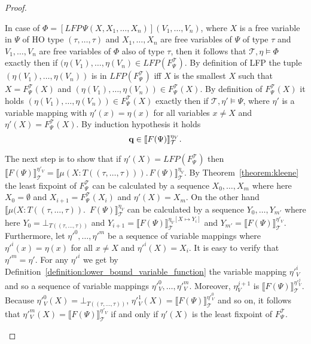 \begin{proof}
\begin{compactitem}
        \item In case of $\Phi = [LFP\,\Psi(X, X_1, \dots, X_n)](V_1, \dots, V_n)$, where $X$ is a
        free variable in $\Psi$ of HO type $(\tau, \dots, \tau)$ and $X_1, \dots, X_n$ are free
        variables of $\Psi$ of type $\tau$ and $V_1, \dots, V_n$ are free variables of $\Phi$ also of type $\tau$, then
        it follows that $\mathcal{T}, \eta \models \Phi$ exactly then if $(\eta(V_1), \dots, \eta(V_n) \in LFP
        (F_\Psi^\mathcal{T})$. By definition of LFP the tuple $(\eta(V_1), \dots, \eta(V_n))$ is in
        $LFP(F_\Psi^\mathcal{T})$ iff $X$ is the smallest $X$ such that $X = F_\Psi^\mathcal{T}(X)$ and $(\eta(V_1), \dots, \eta(V_n)) \in
        F_\Psi^\mathcal{T}(X)$. By definition of $F_\Psi^\mathcal{T}(X)$ it holds $(\eta
        (V_1), \dots, \eta(V_n)) \in F_\Psi^\mathcal{T}(X)$ exactly then if $\mathcal{T}, \eta' 
        \models \Psi$, where $\eta'$ is a variable mapping with $\eta'(x) = \eta(x)$ for all variables $x \neq X$ and $\eta'(X) = F_\Psi^\mathcal{T}(X)$. By induction hypothesis it holds
        \[\emph{q} \in \llbracket  F(\Psi)
        \rrbracket^{\eta_V}_\mathcal{T}.\]

The next step is to show that if $\eta'(X) = LFP(F^\mathcal{T}_\Psi)$ then $\llbracket F(\Psi) \rrbracket^{\eta'_V}_\mathcal{T} = \llbracket \mu (X \colon T((\tau, \dots, \tau))).\,F(\Psi)\rrbracket_\mathcal{T}^{\eta_V}$. 
        By Theorem~\ref{theorem:kleene} the least fixpoint of $F^\mathcal{T}_\Psi$ can be calculated by a sequence $X_0, \dots, X_m$ where here $X_0 = \emptyset$ and $X_{i+1} 
        = F_\Psi^\mathcal{T}(X_i)$ and $\eta'(X) = X_m$. On the other hand $\llbracket \mu (X \colon T((\tau, \dots, \tau)).$ $\,F(\Psi)\rrbracket_\mathcal{T}^{\eta_V}$ can be calculated by a sequence 
         $Y_0, \dots, Y_{m'}$ where here $Y_0 = \bot_{T((\tau, \dots, \tau))}$ and $Y_{i+1} = \llbracket F(\Psi)\rrbracket_\mathcal{T}^{\eta_V[X \mapsto Y_i]}$ and $Y_{m'} = \llbracket F(\Psi)\rrbracket_\mathcal{T}^{\eta'_V}$. Furthermore, let $\eta'^0, \dots, \eta'^m$ be a sequence of variable mappings where $\eta'^i(x) = \eta(x)$ for all $x \neq X$ and $\eta'^i(X) = X_i$. It is easy to verify that $\eta'^m = \eta'$. For any $\eta'^i$ we get by Definition~\ref{definition:lower_bound_variable_function} the variable mapping $\eta'^i_V$ and so a sequence of variable mappings $\eta'^0_V, \dots, \eta'^m_V$. Moreover, $\eta^{j+1}_V$ is $\llbracket F(\Psi)\rrbracket_\mathcal{T}^{\eta'^j_V}$. Because $\eta'^0_V(X) = \bot_{T((\tau, \dots, \tau))}$, $\eta'^1_V(X) =\llbracket F(\Psi)\rrbracket_\mathcal{T}^{\eta'^0_V}$ and so on, it follows that $\eta'^m_V(X) = \llbracket F(\Psi) \rrbracket^{\eta'_V}_\mathcal{T}$ if and only if $\eta'(X)$ is the least fixpoint of $F^\mathcal{T}_\Psi$.
        

\end{compactitem}
\end{proof}
